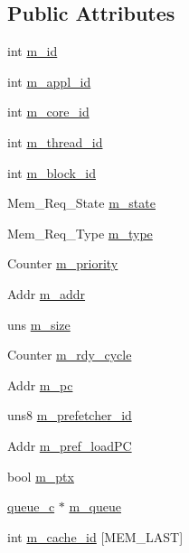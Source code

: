 \subsection*{Public Attributes}
\begin{DoxyCompactItemize}
\item 
int \hyperlink{structmem__req__s_aa1ce2eda1984474c5304bc52e0f96445}{m\_\-id}
\item 
int \hyperlink{structmem__req__s_a256acada11160343b8fd7b0f410c80c8}{m\_\-appl\_\-id}
\item 
int \hyperlink{structmem__req__s_ae79108aead8de2855cccdaf981cb81f8}{m\_\-core\_\-id}
\item 
int \hyperlink{structmem__req__s_a8f90cf134af2d0965d436574f77693ef}{m\_\-thread\_\-id}
\item 
int \hyperlink{structmem__req__s_ad160765e9454b1e36dc188805585a3ff}{m\_\-block\_\-id}
\item 
Mem\_\-Req\_\-State \hyperlink{structmem__req__s_a06db9581649b020ba9b693397a2b90f7}{m\_\-state}
\item 
Mem\_\-Req\_\-Type \hyperlink{structmem__req__s_a9cc3c968ca7bea8f7e9585b2aaea0ede}{m\_\-type}
\item 
Counter \hyperlink{structmem__req__s_af7a1252bce4c150639539ba1551a3d33}{m\_\-priority}
\item 
Addr \hyperlink{structmem__req__s_a835153e595f8931c1259d7074c6f1019}{m\_\-addr}
\item 
uns \hyperlink{structmem__req__s_a4d0488370174c8f3b7200cc4658c9d32}{m\_\-size}
\item 
Counter \hyperlink{structmem__req__s_a61a80fc35da503e4334d0dc79e2c3ff5}{m\_\-rdy\_\-cycle}
\item 
Addr \hyperlink{structmem__req__s_a94e91af0e42f5b41778fed51aa5614c7}{m\_\-pc}
\item 
uns8 \hyperlink{structmem__req__s_a230c4f2a949162d7417337f4a06ac14c}{m\_\-prefetcher\_\-id}
\item 
Addr \hyperlink{structmem__req__s_aa33fc982a960ecccb76d44fc0d3ac039}{m\_\-pref\_\-loadPC}
\item 
bool \hyperlink{structmem__req__s_a5f13d6f19dd50e8cc25ef9a795842007}{m\_\-ptx}
\item 
\hyperlink{classqueue__c}{queue\_\-c} $\ast$ \hyperlink{structmem__req__s_a01bfbc2d9326cadcb66c356740d10eb9}{m\_\-queue}
\item 
int \hyperlink{structmem__req__s_a136b8b016a5e922dbc766490e5478b3e}{m\_\-cache\_\-id} \mbox{[}MEM\_\-LAST\mbox{]}
\item 

\end{DoxyCompactItemize}
